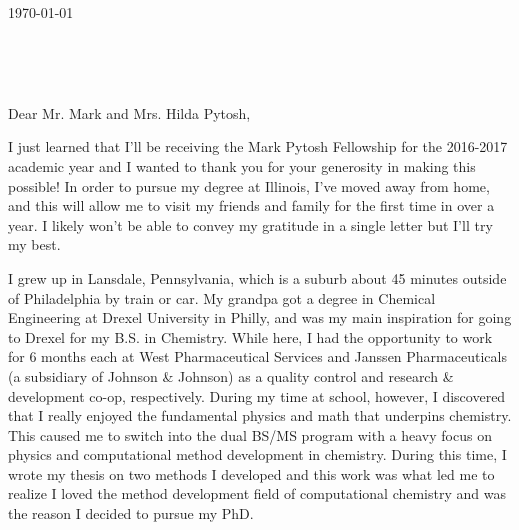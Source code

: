 \documentclass[11pt,a4paper]{letter} %
\def\opening#1{\thispagestyle{empty}
{\centering\fromaddress \vspace{0.6in} \\ %
\hspace*{\longindentation}\hspace*{\fill}\par} %
{\raggedright \toname \\ \toaddress \par} %
\vspace{0.4in} %
\noindent #1 %
}
\begin{document}

\begin{letter}
{\today}


\opening{Dear Mr. Mark and Mrs. Hilda Pytosh,}

I just learned that I'll be receiving the Mark Pytosh Fellowship for the 2016-2017 academic year and I wanted to thank you for your generosity in making this possible! In order to pursue my degree at Illinois, I've moved away from home, and this will allow me to visit my friends and family for the first time in over a year. I likely won't be able to convey my gratitude in a single letter but I'll try my best. 

 I grew up in Lansdale, Pennsylvania, which is a suburb about 45 minutes outside of Philadelphia by train or car. My grandpa got a degree in Chemical Engineering at Drexel University in Philly, and was my main inspiration for going to Drexel for my B.S. in Chemistry. While here, I had the opportunity to work for 6 months each at West Pharmaceutical Services and Janssen Pharmaceuticals (a subsidiary of Johnson \& Johnson) as a quality control and research \& development co-op, respectively. During my time at school, however, I discovered that I really enjoyed the fundamental physics and math that underpins chemistry. This caused me to switch into the dual BS/MS program with a heavy focus on physics and computational method development in chemistry. During this time, I wrote my thesis on two methods I developed and this work was what led me to realize I loved the method development field of computational chemistry and was the reason I decided to pursue my PhD. 


\end{letter}
\end{document}
